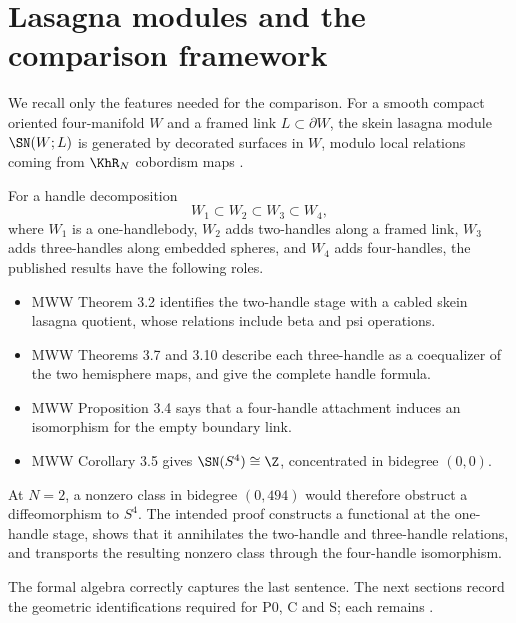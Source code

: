 \section{Lasagna modules and the comparison framework}

We recall only the features needed for the comparison.  For a smooth
compact oriented four-manifold $W$ and a framed link $L\subset\partial W$,
the skein lasagna module $\SN(W;L)$ is generated by decorated surfaces in
$W$, modulo local relations coming from $\KhR_N$ cobordism maps
\cite{MorrisonWalkerWedrich2019,ManolescuWalkerWedrich2023}.

For a handle decomposition
\[
W_1\subset W_2\subset W_3\subset W_4,
\]
where $W_1$ is a one-handlebody, $W_2$ adds two-handles along a framed link,
$W_3$ adds three-handles along embedded spheres, and $W_4$ adds four-handles,
the published results have the following roles.
\begin{itemize}
\item MWW Theorem 3.2 identifies the two-handle stage with a cabled skein
lasagna quotient, whose relations include beta and psi operations.
\item MWW Theorems 3.7 and 3.10 describe each three-handle as a coequalizer
of the two hemisphere maps, and give the complete handle formula.
\item MWW Proposition 3.4 says that a four-handle attachment induces an
isomorphism for the empty boundary link.
\item MWW Corollary 3.5 gives
$\SN(S^4)\cong\Z$, concentrated in bidegree $(0,0)$.
\end{itemize}

At $N=2$, a nonzero class in bidegree $(0,494)$ would therefore obstruct a
diffeomorphism to $S^4$.  The intended proof constructs a functional at the
one-handle stage, shows that it annihilates the two-handle and three-handle
relations, and transports the resulting nonzero class through the
four-handle isomorphism.

The formal algebra correctly captures the last sentence.  The next sections
record the geometric identifications required for P0, C and S; each remains
\Open.
